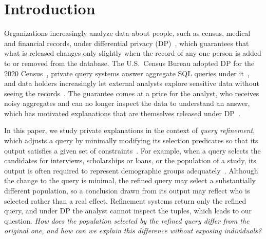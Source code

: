 \section{Introduction}
\label{sec:introduction}

Organizations increasingly analyze data about people, such as census, medical and financial records, under differential privacy (DP)~\cite{DMNS2006,TheAlgFoundDP2014}, which guarantees that what is released changes only slightly when the record of any one person is added to or removed from the database.
The U.S.\ Census Bureau adopted DP for the 2020 Census~\cite{Abowd18}, private query systems answer aggregate SQL queries under it~\cite{mcsherry2009,JNS18,JNHS20}, and data holders increasingly let external analysts explore sensitive data without seeing the records~\cite{GeHIM19}.
The guarantee comes at a price for the analyst, who receives noisy aggregates and can no longer inspect the data to understand an answer, which has motivated explanations that are themselves released under DP~\cite{TaoGMR22,DPClustX}.

In this paper, we study private explanations in the context of \emph{query refinement}, which adjusts a query by minimally modifying its selection predicates so that its output satisfies a given set of constraints~\cite{LMSJ23,SSAD22,CSSM24,MLJ22,HacohenMS25,CampbellSM24}.
For example, when a query selects the candidates for interviews, scholarships or loans, or the population of a study, its output is often required to represent demographic groups adequately~\cite{SYJ18,AsudehJJ19,ICDE23,barocas-hardt-narayanan}.
Although the change to the query is minimal, the refined query may select a substantially different population, so a conclusion drawn from its output may reflect who is selected rather than a real effect.
Refinement systems return only the refined query, and under DP the analyst cannot inspect the tuples, which leads to our question.
\emph{How does the population selected by the refined query differ from the original one, and how can we explain this difference without exposing individuals?}

